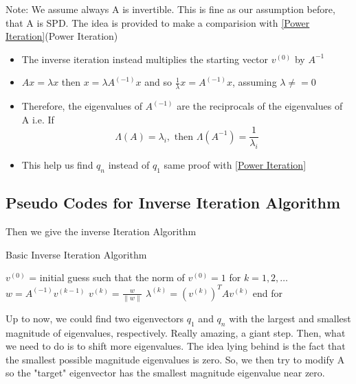 Note: We assume always A is invertible. This is fine as our assumption before, that A is SPD.
The idea is provided to make a comparision with \ref{Power Iteration}(Power Iteration)

    \begin{itemize}
        \item The inverse iteration instead multiplies the starting vector $v^{(0)}$ by $A^{-1}$
        \item $Ax = \lambda x$ then $x = \lambda A^{(-1)}x$ and so 
        $\frac{1}{\lambda}x = A^{(-1)}x$, assuming $\lambda \neq = 0$
        \item Therefore, the eigenvalues of $A^{(-1)}$ are the reciprocals of the eigenvalues of A i.e.
        If \[\Lambda(A) = {\lambda_i}, \text{ then } \Lambda(A^{-1}) = {\frac{1}{\lambda_i}}\]
        \item This help us find $q_n$ instead of $q_1$
        same proof with \ref{Power Iteration}
    \end{itemize}
\subsection{Pseudo Codes for Inverse Iteration Algorithm}
Then we give the inverse Iteration Algorithm 
    \begin{algorithm}
    \caption{Basic Inverse Iteration Algorithm}
    \begin{algorithmic}
        \STATE \( v^{(0)} \) = initial guess such that the norm of \( v^{(0)} = 1 \)
        \STATE for \( k = 1, 2, \dots \)
        \STATE \quad \( w = A^{(-1)} v^{(k-1)} \)
        \STATE \quad \( v^{(k)} = \frac{w}{\|w\|} \)
        \STATE \quad \( \lambda^{(k)} = (v^{(k)})^T A v^{(k)} \)
        \STATE end for
    \end{algorithmic}
\end{algorithm}

Up to now, we could find two eigenvectors $q_1$ and $q_n$ with the largest and smallest magnitude of eigenvalues, respectively. Really amazing, a giant step. Then, what we need to do is to shift more eigenvalues. The idea lying behind is the fact that the smallest possible magnitude eigenvalues is zero. So, we then try to modify A so the "target" eigenvector has the smallest magnitude eigenvalue near zero.

